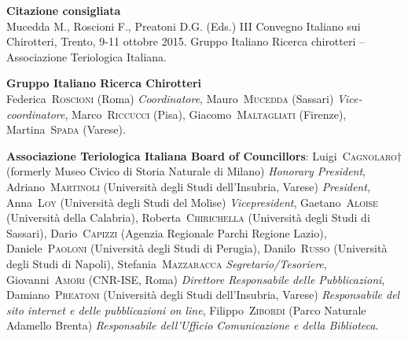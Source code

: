{  \par\vspace{\hysspacer}
  \par%
  \vfill
  \begin{footnotesize}
  {\noindent\textbf{Citazione consigliata}}\\  
  {\noindent Mucedda M., Roscioni F., Preatoni D.G. (Eds.) III Convegno Italiano sui Chirotteri, Trento, 9-11 ottobre 2015. Gruppo Italiano Ricerca chirotteri -- Associazione Teriologica Italiana.}
  \par\vspace{\hysspacer}
  {\noindent\textbf{Gruppo Italiano Ricerca Chirotteri}}\\  
  Federica~\textsc{Roscioni} (Roma) \textit{Coordinatore}, Mauro~\textsc{Mucedda} (Sassari) \textit{Vice-coordinatore}, Marco~\textsc{Riccucci} (Pisa), Giacomo~\textsc{Maltagliati} (Firenze), Martina~\textsc{Spada} (Varese).
  \par\vspace{\hysspacer}
  \noindent\textbf{Associazione Teriologica Italiana Board of Councillors}:
      Luigi~\textsc{Cagnolaro}$\dagger$ (formerly Museo Civico di Storia Naturale di Milano) \textit{Honorary President}, Adriano~\textsc{Martinoli} (Università degli Studi dell'Insubria, Varese) \textit{President}, Anna~\textsc{Loy} (Università degli Studi del Molise) \textit{Vicepresident}, Gaetano~\textsc{Aloise} (Università della Calabria), Roberta~\textsc{Chirichella} (Università degli Studi di Sassari), Dario~\textsc{Capizzi} (Agenzia Regionale Parchi Regione Lazio),     Daniele~\textsc{Paoloni} (Università degli Studi di Perugia), Danilo~\textsc{Russo} (Università degli Studi di Napoli), Stefania~\textsc{Mazzaracca} \textit{Segretario/Tesoriere}, Giovanni~\textsc{Amori} (CNR-ISE, Roma) \textit{Direttore Responsabile delle Pubblicazioni}, Damiano~\textsc{Preatoni} (Università degli Studi dell'Insubria, Varese) \textit{Responsabile del sito internet e delle pubblicazioni \textsf{on line}}, Filippo~\textsc{Zibordi} (Parco Naturale Adamello Brenta) \textit{Responsabile dell'Ufficio Comunicazione e della Biblioteca}.\par
    \end{footnotesize}  
  \hysfooter%
  \endgroup}

